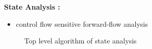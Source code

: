\documentclass{beamer}
\begin{document}
\frame
{
	\frametitle{\subsecname}
	\textbf{State Analysis :}	
	\begin{itemize}
	\item control flow sensitive forward-flow analysis
	\end{itemize}
	\begin{figure}
\begin{center}
\begin{framed}
\scalebox{.6}{
 }
\end{framed}
\small{Top level algorithm of state analysis}
\end{center}
\end{figure}
	
}
\end{document}
